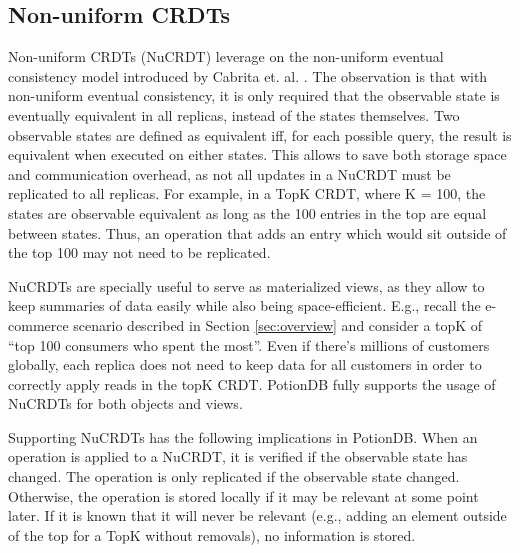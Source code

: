 \documentclass{vldb}
\newcommand{\grumbler}[2]{{\color{red}{\bf #1:} #2}}
\renewcommand{\grumbler}[2]{}
\newcommand{\andre}[1]{\grumbler{andre}{#1}}
\begin{document}

\subsection{Non-uniform CRDTs}

Non-uniform CRDTs (NuCRDT) leverage on the non-uniform eventual consistency model introduced by Cabrita et. al. \cite{Cabrita17Nonuniform}.
The observation is that with non-uniform eventual consistency, it is only required that the observable state is eventually equivalent in all replicas, instead of the states themselves.
Two observable states are defined as equivalent iff, for each possible query, the result is equivalent when executed on either states.
This allows to save both storage space and communication overhead, as not all updates in a NuCRDT must be replicated to all replicas.
For example, in a TopK CRDT, where K = 100, the states are observable equivalent as long as the 100 entries in the top are equal between states.
Thus, an operation that adds an entry which would sit outside of the top 100 may not need to be replicated.

NuCRDTs are specially useful to serve as materialized views, as they allow to keep summaries of data easily while also being space-efficient.
E.g., recall the e-commerce scenario described in Section \ref{sec:overview} and consider a topK of ``top 100 consumers who spent the most''. 
Even if there's millions of customers globally, each replica does not need to keep data for all customers in order to correctly apply reads in the topK CRDT.
PotionDB fully supports the usage of NuCRDTs for both objects and views.

Supporting NuCRDTs has the following implications in PotionDB.
When an operation is applied to a NuCRDT, it is verified if the observable state has changed.
The operation is only replicated if the observable state changed.
Otherwise, the operation is stored locally if it may be relevant at some point later.
If it is known that it will never be relevant (e.g., adding an element outside of the top for a TopK without removals), no information is stored.

\andre{Note: in theory, for fault tolerance purposes, even operations that do not change the visible state should be replicated to a subset of the replicas. This is, however, not currently supported by PotionDB. Should we mention we plan to address this in future work?}
\end{document}
